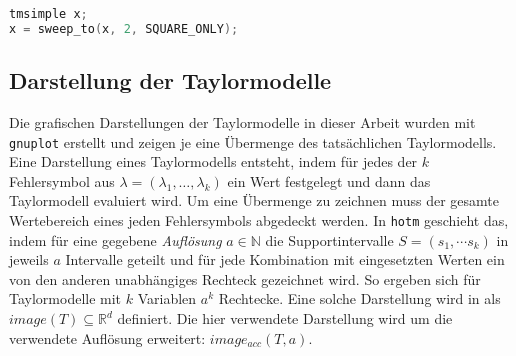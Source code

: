 \begin{lstlisting}[language=C++, caption=Beispielaufruf der Sweeping-Routine,captionpos=b,xleftmargin=15pt]
tmsimple x;
x = sweep_to(x, 2, SQUARE_ONLY);
\end{lstlisting}



\subsection{Darstellung der Taylormodelle}
Die grafischen Darstellungen der Taylormodelle in dieser Arbeit wurden mit \verb+gnuplot+ \cite{gnuplot} erstellt und zeigen je eine Übermenge des tatsächlichen Taylormodells. Eine Darstellung eines Taylormodells entsteht, indem für jedes der $k$ Fehlersymbol aus $\lambda=(\lambda_1, \dots, \lambda_k)$ ein Wert festgelegt und dann das Taylormodell evaluiert wird. Um eine Übermenge zu zeichnen muss der gesamte Wertebereich eines jeden Fehlersymbols abgedeckt werden. In \verb+hotm+ geschieht das, indem für eine gegebene \textit{Auflösung} $a \in \mathbb{N}$ die Supportintervalle $S=(s_1, \cdots s_k)$ in jeweils $a$ Intervalle geteilt und für jede Kombination mit eingesetzten Werten ein von den anderen unabhängiges Rechteck gezeichnet wird. So ergeben sich für Taylormodelle mit $k$ Variablen $a^k$ Rechtecke. Eine solche Darstellung wird in \cite{DBLP:conf/macis/BrausseKM15} als $image(T) \subseteq \mathbb{R}^d$ definiert. Die hier verwendete Darstellung wird um die verwendete Auflösung erweitert: $image_{acc}(T,a)$.


